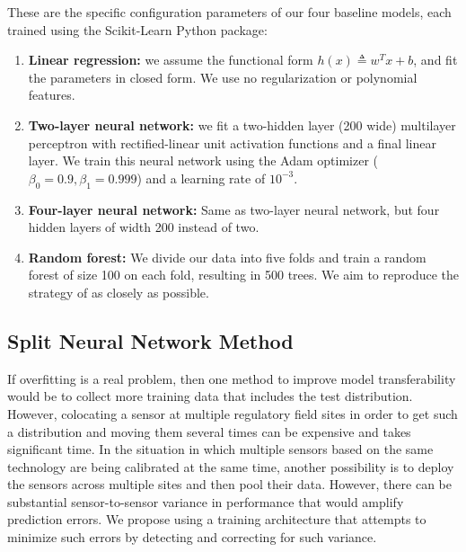 \documentclass[journal abbreviation, manuscript]{copernicus}
\begin{document}

These are the specific configuration parameters of our four baseline models, each trained using the Scikit-Learn Python package: 
\begin{enumerate}
    \item \textbf{Linear regression:} we assume the functional form $h(x) \triangleq w^T x + b$, and fit the parameters in closed form. We use no regularization or polynomial features.
    \item \textbf{Two-layer neural network:} we fit a two-hidden layer (200 wide) multilayer perceptron with rectified-linear unit activation functions and a final linear layer. We train this neural network using the Adam optimizer ($\beta_0 = 0.9, \beta_1 = 0.999$) and a learning rate of $10^{-3}$.
    \item \textbf{Four-layer neural network:} Same as two-layer neural network, but four hidden layers of width 200 instead of two.
    \item \textbf{Random forest:} We divide our data into five folds and train a random forest of size 100 on each fold, resulting in 500 trees. We aim to reproduce the strategy of \cite{Zimmerman2018} as closely as possible.
\end{enumerate}

\subsection{Split Neural Network Method}\label{sec:split-nn}
If overfitting is a real problem, then one method to improve model transferability would be to collect more training data that includes the test distribution. However, colocating a sensor at multiple regulatory field sites in order to get such a distribution and moving them several times can be expensive and takes significant time.  In the situation in which multiple sensors based on the same technology are being calibrated at the same time, another possibility is to deploy the sensors across multiple sites and then pool their data.  However, there can be substantial sensor-to-sensor variance in performance that would amplify prediction errors.  We propose using a training architecture that attempts to minimize such errors by detecting and correcting for such variance.
\end{document}
